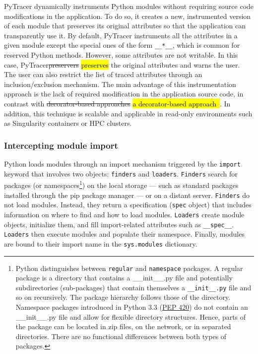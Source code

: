 \documentclass[10pt,journal,compsoc]{IEEEtran}
\newcommand{\pytracer}[0]{PyTracer\xspace}
\DeclareRobustCommand{\add}[1]{\sethlcolor{lightgreen}\hl{#1}}
\DeclareRobustCommand{\remove}[1]{\textcolor{lightred}{\sout{#1}}}
\begin{document}
\pytracer dynamically instruments Python modules without requiring source code
modifications in the application. To do so, it creates a new, instrumented
version of each module that preserves its original attributes so that the
application can transparently use it.
By default, \pytracer instruments all the attributes in a given module except
the special ones of the form \texttt{\_\_*\_\_}, which is common for reserved
Python methods. However, some attributes are not writable. In this case,
\pytracer \remove{preservers} \add{preserves} the original attributes and warns
the user. The user can also restrict the list of traced attributes through an
inclusion/exclusion mechanism. The main advantage of this instrumentation
approach is the lack of required modification in the application source code, in
contrast with \remove{decorator-based approaches} \add{a decorator-based
    approach~\mbox{\cite{hunt2019decorators}}}. In addition, this technique is
scalable and applicable in read-only environments such as Singularity containers
or HPC clusters.





\subsubsection{Intercepting module import}

Python loads modules through an import mechanism triggered by the
\texttt{import} keyword that involves two objects: \texttt{finders} and
\texttt{loaders}. \texttt{Finders} search for packages (or
namespaces\footnote{Python distinguishes between \texttt{regular} and
    \texttt{namespace} packages. A regular package is a directory that contains a
    \_\_init\_\_.py file and potentially subdirectories (sub-packages) that contain
    themselves a \texttt{\_\_init\_\_.py} file and so on recursively. The package
    hierarchy follows those of the directory. Namespace packages introduced in
    Python 3.3 (\href{https://www.python.org/dev/peps/pep-0420/}{PEP 420}) do not
    contain an \_\_init\_\_.py file and allow for flexible directory structures.
    Hence, parts of the package can be located in zip files, on the network, or in
    separated directories. There are no functional differences between both types of
    packages.}) on the local storage --- such as standard packages installed through
the pip package manager --- or on a distant server. \texttt{Finders} do not load
modules. Instead, they return a specification (\texttt{spec} object) that
includes information on where to find and how to load modules. \texttt{Loaders}
create module objects, initialize them, and fill import-related attributes such
as \texttt{\_\_spec\_\_}. \texttt{Loaders} then execute modules and populate
their namespace. Finally, modules are bound to their import name in the
\texttt{sys.modules} dictionary.
\end{document}
